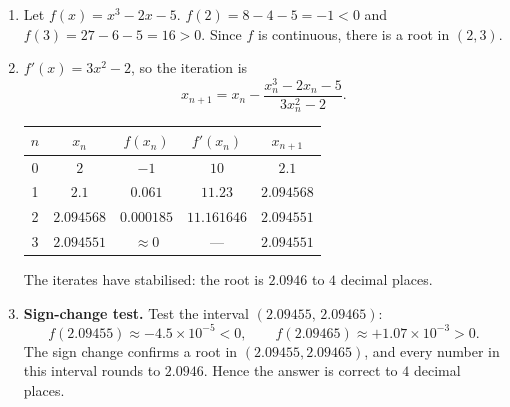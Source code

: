 \documentclass[11pt]{article}
\begin{document}
\begin{corrige}
\begin{enumerate}
\item Let $f(x)=x^{3}-2x-5$. $f(2)=8-4-5=-1<0$ and $f(3)=27-6-5=16>0$. Since $f$ is continuous, there is a root in $(2,3)$.
\item $f'(x)=3x^{2}-2$, so the iteration is
\[
x_{n+1}=x_{n}-\frac{x_{n}^{3}-2x_{n}-5}{3x_{n}^{2}-2}.
\]
\begin{center}
\begin{tabular}{|c|c|c|c|c|}
\hline
\rowcolor{popblueL} $n$ & $x_{n}$ & $f(x_{n})$ & $f'(x_{n})$ & $x_{n+1}$ \\
\hline
0 & $2$ & $-1$ & $10$ & $2.1$ \\
\hline
1 & $2.1$ & $0.061$ & $11.23$ & $2.094568$ \\
\hline
2 & $2.094568$ & $0.000185$ & $11.161646$ & $2.094551$ \\
\hline
3 & $2.094551$ & $\approx 0$ & --- & $2.094551$ \\
\hline
\end{tabular}
\end{center}
The iterates have stabilised: the root is $\boxed{2.0946}$ to $4$ decimal places.
\item \textbf{Sign-change test.} Test the interval $(2.09455,\,2.09465)$:
\[
f(2.09455)\approx -4.5\times10^{-5}<0,\qquad f(2.09465)\approx +1.07\times10^{-3}>0.
\]
The sign change confirms a root in $(2.09455,2.09465)$, and every number in this interval rounds to $2.0946$. Hence the answer is correct to $4$ decimal places.
\end{enumerate}
\end{corrige}
\end{document}
